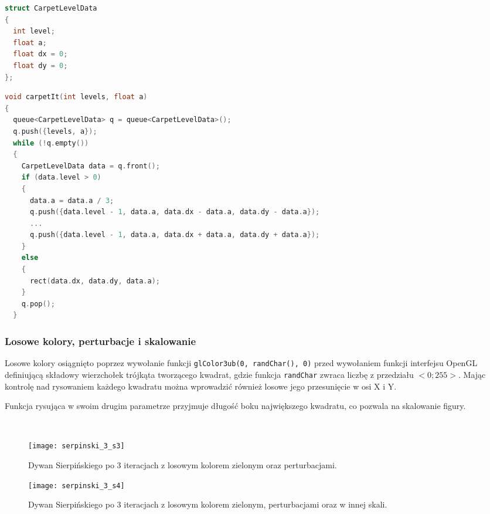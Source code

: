 \begin{lstlisting}[language=C++, caption=Struktura danych przechowująca aktualny stan rysowania.]
struct CarpetLevelData
{
  int level;
  float a;
  float dx = 0;
  float dy = 0;
};
\end{lstlisting}


\begin{lstlisting}[language=C++, caption=Funkcja rysująca dywan Sierpińskiego iteracyjnie. Pominięto niektóre wywołania.]
void carpetIt(int levels, float a)
{
  queue<CarpetLevelData> q = queue<CarpetLevelData>();
  q.push({levels, a});
  while (!q.empty())
  {
    CarpetLevelData data = q.front();
    if (data.level > 0)
    {
      data.a = data.a / 3;
      q.push({data.level - 1, data.a, data.dx - data.a, data.dy - data.a});
      ...
      q.push({data.level - 1, data.a, data.dx + data.a, data.dy + data.a});
    }
    else
    {
      rect(data.dx, data.dy, data.a);
    }
    q.pop();
  }
\end{lstlisting}

\subsubsection{Losowe kolory, perturbacje i skalowanie}
Losowe kolory osiągnięto poprzez wywołanie funkcji \lstinline{glColor3ub(0, randChar(), 0)} przed wywołaniem funkcji interfejsu OpenGL definiującą składowy wierzchołek trójkąta tworzącego kwadrat, gdzie funkcja \lstinline{randChar} zwraca liczbę z przedziału $<0;255>$. Mając kontrolę nad rysowaniem każdego kwadratu można wprowadzić również losowe jego przesunięcie w osi X i Y.

Funkcja rysująca w swoim drugim parametrze przyjmuje długość boku największego kwadratu, co pozwala na skalowanie figury.


\begin{figure}[H]
  \
  \begin{minipage}[t]{.45\linewidth}
  \texttt{[image: serpinski\_3\_s3]}
      \caption{Dywan Sierpińskiego po 3 iteracjach z losowym kolorem zielonym oraz perturbacjami.}
    \end{minipage}
  \hspace{.05\linewidth}
  \begin{minipage}[t]{0.45\linewidth}
      \texttt{[image: serpinski\_3\_s4]}
      \caption{Dywan Sierpińskiego po 3 iteracjach z losowym kolorem zielonym, perturbacjami oraz w innej skali.}
    \end{minipage}
\end{figure}